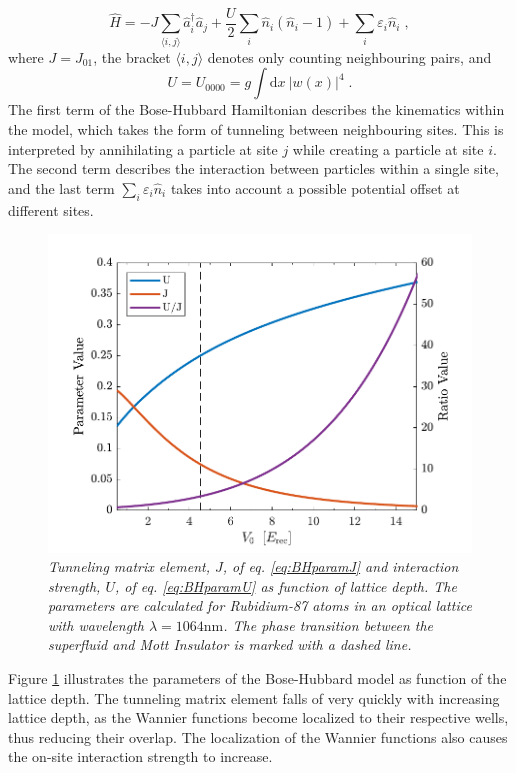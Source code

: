 \begin{equation}
	\hat{H} = - J \sum_{\langle i,j \rangle} \hat{a}_{i}^{\dag} \hat{a}_{j} + \frac{U}{2} \sum_{i} \hat{n}_i \left( \hat{n}_i -1 \right) + \sum_{i} \varepsilon_i \hat{n}_i \; ,
	\label{BHhamil}
\end{equation}
where $J = J_{0 1}$, the bracket $\langle i,j \rangle$ denotes only counting neighbouring pairs, and
\begin{equation}
	U = U_{0 0 0 0} = g \int \mathrm{d}x \ |w(x)|^4 \; .
	\label{eq:BHparamU}
\end{equation}
The first term of the Bose-Hubbard Hamiltonian describes the kinematics within the model, which takes the form of tunneling between neighbouring sites. This is interpreted by annihilating a particle at site $j$ while creating a particle at site $i$. The second term describes the interaction between particles within a single site, and the last term $\sum_{i} \varepsilon_i \hat{n}_i$ takes into account a possible potential offset at different sites.
\begin{figure}[!h]
	\centering
	\includegraphics[width=0.7\columnwidth]{Figures/UJparameters.pdf} 
	\caption{\textit{Tunneling matrix element, $J$, of eq. \eqref{eq:BHparamJ} and interaction strength, $U$, of eq. \eqref{eq:BHparamU} as function of lattice depth. The parameters are calculated for Rubidium-87 atoms in an optical lattice with wavelength $\lambda = 1064 \mathrm{nm}$. The phase transition between the superfluid and Mott Insulator is marked with a dashed line.}}
	\label{fig:UJparameters} 
\end{figure}
Figure \ref{fig:UJparameters} illustrates the parameters of the Bose-Hubbard model as function of the lattice depth. The tunneling matrix element falls of very quickly with increasing lattice depth, as the Wannier functions become localized to their respective wells, thus reducing their overlap. The localization of the Wannier functions also causes the on-site interaction strength to increase.

